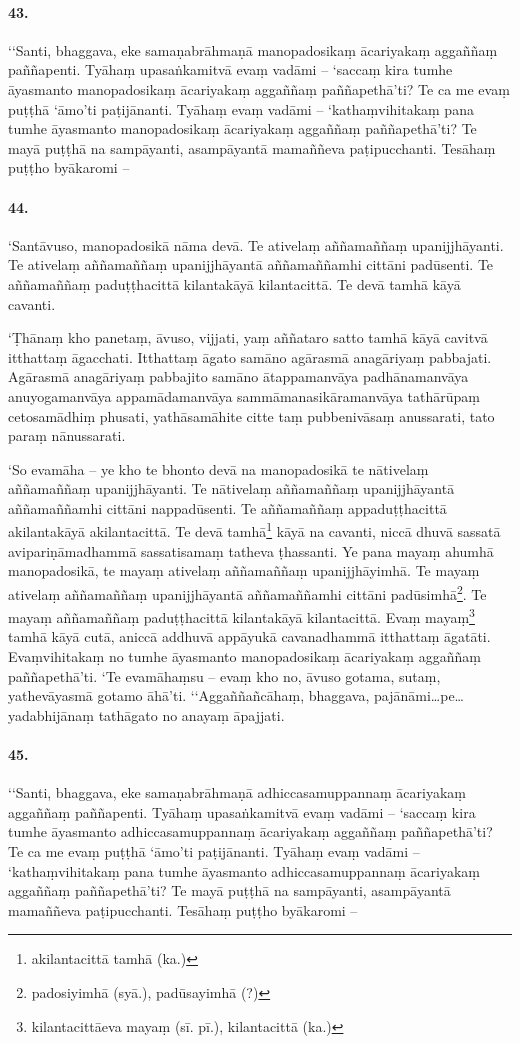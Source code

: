 \paragraph{43.} ‘‘Santi, bhaggava, eke samaṇabrāhmaṇā manopadosikaṃ ācariyakaṃ aggaññaṃ paññapenti. Tyāhaṃ upasaṅkamitvā evaṃ vadāmi – ‘saccaṃ kira tumhe āyasmanto manopadosikaṃ ācariyakaṃ aggaññaṃ paññapethā’ti? Te ca me evaṃ puṭṭhā ‘āmo’ti paṭijānanti. Tyāhaṃ evaṃ vadāmi – ‘kathaṃvihitakaṃ pana tumhe āyasmanto manopadosikaṃ ācariyakaṃ aggaññaṃ paññapethā’ti? Te mayā puṭṭhā na sampāyanti, asampāyantā mamaññeva paṭipucchanti. Tesāhaṃ puṭṭho byākaromi –

\paragraph{44.} ‘Santāvuso, manopadosikā nāma devā. Te ativelaṃ aññamaññaṃ upanijjhāyanti. Te ativelaṃ aññamaññaṃ upanijjhāyantā aññamaññamhi cittāni padūsenti. Te aññamaññaṃ paduṭṭhacittā kilantakāyā kilantacittā. Te devā tamhā kāyā cavanti.

‘Ṭhānaṃ kho panetaṃ, āvuso, vijjati, yaṃ aññataro satto tamhā kāyā cavitvā itthattaṃ āgacchati. Itthattaṃ āgato samāno agārasmā anagāriyaṃ pabbajati. Agārasmā anagāriyaṃ pabbajito samāno ātappamanvāya padhānamanvāya anuyogamanvāya appamādamanvāya sammāmanasikāramanvāya tathārūpaṃ cetosamādhiṃ phusati, yathāsamāhite citte taṃ pubbenivāsaṃ anussarati, tato paraṃ nānussarati.

‘So evamāha – ye kho te bhonto devā na manopadosikā te nātivelaṃ aññamaññaṃ upanijjhāyanti. Te nātivelaṃ aññamaññaṃ upanijjhāyantā aññamaññamhi cittāni nappadūsenti. Te aññamaññaṃ appaduṭṭhacittā akilantakāyā akilantacittā. Te devā tamhā\footnote{akilantacittā tamhā (ka.)} kāyā na cavanti, niccā dhuvā sassatā avipariṇāmadhammā sassatisamaṃ tatheva ṭhassanti. Ye pana mayaṃ ahumhā manopadosikā, te mayaṃ ativelaṃ aññamaññaṃ upanijjhāyimhā. Te mayaṃ ativelaṃ aññamaññaṃ upanijjhāyantā aññamaññamhi cittāni padūsimhā\footnote{padosiyimhā (syā.), padūsayimhā (?)}. Te mayaṃ aññamaññaṃ paduṭṭhacittā kilantakāyā kilantacittā. Evaṃ mayaṃ\footnote{kilantacittāeva mayaṃ (sī. pī.), kilantacittā (ka.)} tamhā kāyā cutā, aniccā addhuvā appāyukā cavanadhammā itthattaṃ āgatāti. Evaṃvihitakaṃ no tumhe āyasmanto manopadosikaṃ ācariyakaṃ aggaññaṃ paññapethā’ti. ‘Te evamāhaṃsu – evaṃ kho no, āvuso gotama, sutaṃ, yathevāyasmā gotamo āhā’ti. ‘‘Aggaññañcāhaṃ, bhaggava, pajānāmi…pe… yadabhijānaṃ tathāgato no anayaṃ āpajjati.

\paragraph{45.} ‘‘Santi, bhaggava, eke samaṇabrāhmaṇā adhiccasamuppannaṃ ācariyakaṃ aggaññaṃ paññapenti. Tyāhaṃ upasaṅkamitvā evaṃ vadāmi – ‘saccaṃ kira tumhe āyasmanto adhiccasamuppannaṃ ācariyakaṃ aggaññaṃ paññapethā’ti? Te ca me evaṃ puṭṭhā ‘āmo’ti paṭijānanti. Tyāhaṃ evaṃ vadāmi – ‘kathaṃvihitakaṃ pana tumhe āyasmanto adhiccasamuppannaṃ ācariyakaṃ aggaññaṃ paññapethā’ti? Te mayā puṭṭhā na sampāyanti, asampāyantā mamaññeva paṭipucchanti. Tesāhaṃ puṭṭho byākaromi –

